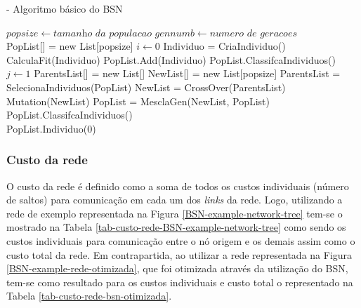 \begin{algorithm} [h]
\caption{ - Algoritmo básico do BSN}
\begin{algorithmic}[1]
\State $popsize\gets \textit{tamanho da populacao}$
\State $gennumb\gets \textit{numero de geracoes}$\\
\State PopList[] = new List[popsize]
\State $i\gets 0$
\State Individuo = CriaIndividuo()
\State CalculaFit(Individuo)\label{bsn:fitness_line}
\State PopList.Add(Individuo)
\State PopList.ClassifcaIndividuos()
\EndWhile{}\\
\State $j\gets 1$
\State ParentsList[] = new List[]
\State NewList[] = new List[popsize]
\State ParentsList = SelecionaIndividuos(PopList)
\State NewList = CrossOver(ParentsList)
\State Mutation(NewList)
\State PopList = MesclaGen(NewList, PopList)
\State PopList.ClassifcaIndividuos()
\EndWhile\\
\State\Return PopList.Individuo(0)
\end{algorithmic}
\label{pseudocode_bsn}
\end{algorithm}

\subsubsection{Custo da rede}
\label{subsection-custo-da-rede}
O custo da rede é definido como a soma de todos os custos individuais (número de saltos) para comunicação em cada um dos \emph{links} da rede. Logo, utilizando a rede de exemplo representada na Figura \ref{BSN-example-network-tree} tem-se o mostrado na Tabela \ref{tab-custo-rede-BSN-example-network-tree} como sendo os custos individuais para comunicação entre o nó origem e os demais assim como o custo total da rede. Em contrapartida, ao utilizar a rede representada na Figura \ref{BSN-example-rede-otimizada}, que foi otimizada através da utilização do BSN, tem-se como resultado para os custos individuais e custo total o representado na Tabela \ref{tab-custo-rede-bsn-otimizada}.

